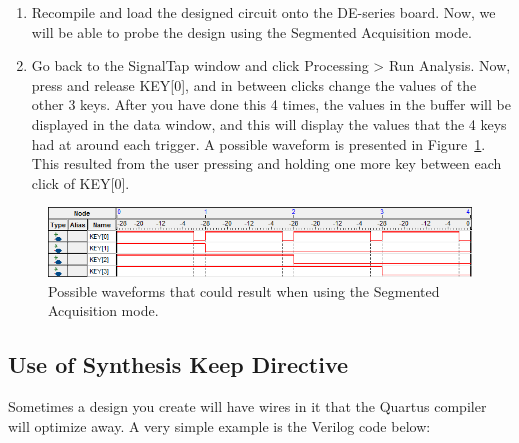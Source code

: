 \documentclass[11pt, twoside, pdftex]{article}
\begin{document}
\begin{enumerate}
\item Recompile and load the designed circuit onto the DE-series board. Now, we will be able to probe the design
using the Segmented Acquisition mode.
  
\item Go back to the SignalTap window and click {\sf Processing > Run Analysis}. Now, press and release KEY[0], and in between clicks
change the values of the other 3 keys. After you have done this 4 times, the values
in the buffer will be displayed in the data window, and this will display the values that the 4 keys had at around each trigger.
A possible waveform is presented in Figure~\ref{fig:24}. This resulted from the user pressing and holding one more key between each click of KEY[0].
  
\end{enumerate}

\begin{figure}[H]
   \begin{center}
      \includegraphics[scale=0.65]{figures/figure24.png}
   \caption{Possible waveforms that could result when using the Segmented Acquisition mode.} 
	 \label{fig:24}
	 \end{center}
\end{figure}

\subsection{Use of Synthesis Keep Directive}

Sometimes a design you create will have wires in it that the Quartus compiler will optimize away. A very simple example
is the Verilog code below:

\end{document}

